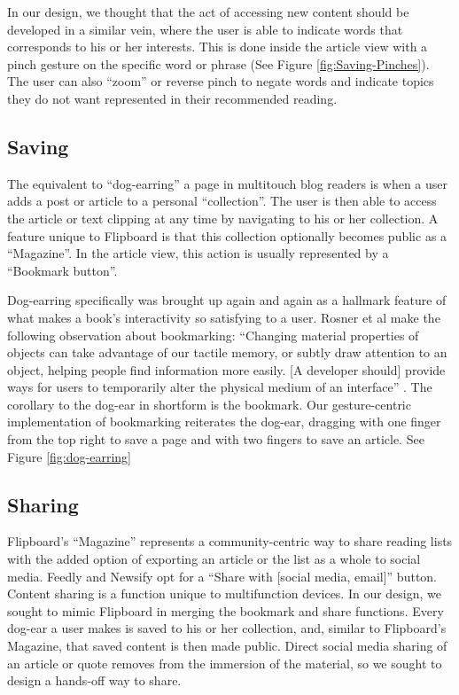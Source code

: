 \documentclass[11pt, oneside]{article}   	%
\begin{document}
In our design, we thought that the act of accessing new content  should be developed in a similar vein, where the user is able to indicate words that corresponds to his or her interests. This is done inside the article view with a pinch gesture on the specific word or phrase (See Figure \ref{fig:Saving-Pinches}). The user can also ``zoom'' or reverse pinch to negate words and indicate topics they do not want represented in their recommended reading.

\subsection{Saving}
The equivalent to ``dog-earring''  a page in multitouch blog readers is when a user adds a post or article to a personal ``collection''. The user is then able to access the article or text clipping at any time by navigating to his or her collection. A feature unique to Flipboard is that this collection optionally becomes public as a ``Magazine''. In the article view, this action is usually represented by a ``Bookmark button''.


Dog-earring specifically was brought up again and again as a hallmark feature of what makes a book's interactivity so satisfying to a user. Rosner et al make the following observation about bookmarking: ``Changing material properties of objects can take advantage of our tactile memory, or subtly draw attention to an object, helping people find information more easily. [A developer should] provide ways for users to temporarily alter the physical medium of an interface'' \cite{Rosner}. The corollary to the dog-ear in shortform is the bookmark. Our gesture-centric implementation of bookmarking reiterates the dog-ear, dragging with one finger from the top right to save a page and with two fingers to save an article. See Figure \ref{fig:dog-earring}

\subsection{Sharing}
Flipboard's ``Magazine'' represents a community-centric way to share reading lists with the added option of exporting an article or the list as a whole to social media. Feedly and Newsify opt for a ``Share with [social media, email]'' button. Content sharing is a function unique to multifunction devices. In our design, we sought to mimic Flipboard in merging the bookmark and share functions. Every dog-ear a user makes is saved to his or her collection, and, similar to Flipboard's Magazine, that saved content is then made public. Direct social media sharing of an article or quote removes from the immersion of the material, so we sought to design a hands-off way to share.
\end{document}
